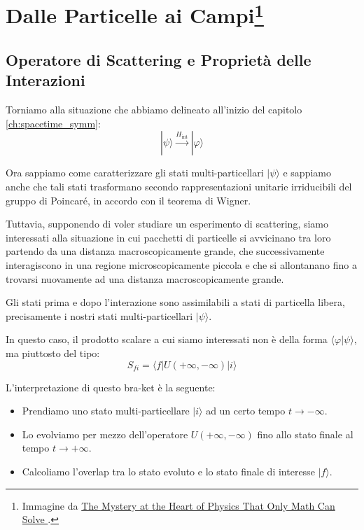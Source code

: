 \documentclass[../main.tex]{subfiles}
\begin{document}
\setchapterpreamble[u]{\margintoc}
\chapter[Dalle Particelle ai Campi]{Dalle Particelle ai Campi\footnote{Immagine da \href{https://www.quantamagazine.org/the-mystery-at-the-heart-of-physics-that-only-math-can-solve-20210610/}{The Mystery at the Heart of Physics That Only Math Can Solve
}.}}
\label{ch:pcles_to_fields}
\fboxsep =1pt %

\section{Operatore di Scattering e Proprietà delle Interazioni}
Torniamo alla situazione che abbiamo delineato all'inizio del capitolo \ref{ch:spacetime_symm}:
\[
|\psi\rangle \xrightarrow[]{ H_\text{int}} |\varphi\rangle 
\]

Ora sappiamo come caratterizzare gli stati multi-particellari \(|\psi\rangle\) e sappiamo anche che tali stati trasformano secondo rappresentazioni unitarie irriducibili del gruppo di Poincaré, in accordo con il teorema di Wigner.

Tuttavia, supponendo di voler studiare un esperimento di scattering, siamo interessati alla situazione in cui pacchetti di particelle si avvicinano tra loro partendo da una distanza macroscopicamente grande, che successivamente interagiscono in una regione microscopicamente piccola e che si allontanano fino a trovarsi nuovamente ad una distanza macroscopicamente grande.

Gli stati prima e dopo l'interazione sono assimilabili a stati di particella libera, precisamente i nostri stati multi-particellari \(|\psi\rangle\).

In questo caso, il prodotto scalare a cui siamo interessati non è della forma \(\langle\varphi|\psi\rangle\), ma piuttosto del tipo:
\[
S_{fi} = \langle f| U(+\infty, -\infty) |i\rangle
\]

L'interpretazione di questo bra-ket è la seguente:
\begin{itemize}
    \item Prendiamo uno stato multi-particellare $|i\rangle$ ad un certo tempo $t\rightarrow -\infty$.
    \item Lo evolviamo per mezzo dell'operatore $U(+\infty, -\infty)$ fino allo stato finale al tempo $t\rightarrow +\infty$.
    \item Calcoliamo l'overlap tra lo stato evoluto e lo stato finale di interesse $|f\rangle$.
\end{itemize}
\end{document}
